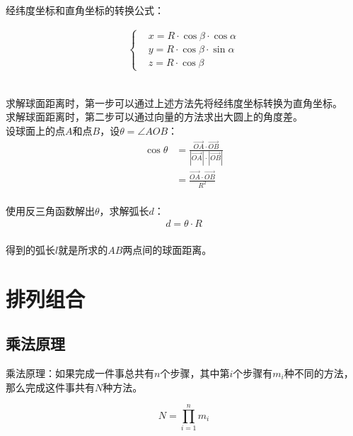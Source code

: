\documentclass[UTF8]{ctexart}
\begin{document}
    经纬度坐标和直角坐标的转换公式：\vspace{5pt}
    \begin{large}
        \begin{align*}
            \begin{cases}
                &x=R\cdot\cos{\beta}\cdot\cos{\alpha}\\[2mm]
                &y=R\cdot\cos{\beta}\cdot\sin{\alpha}\\[2mm]
                &z=R\cdot\cos{\beta}
            \end{cases}
        \end{align*}
    \end{large}\\
    求解球面距离时，第一步可以通过上述方法先将经纬度坐标转换为直角坐标。\\[3mm]
    求解球面距离时，第二步可以通过向量的方法求出大圆上的角度差。\\[5mm]
    设球面上的点$A$和点$B$，设$\theta=\angle AOB$：\vspace{3pt}
    \begin{align}
        \cos{\theta}
        &=\frac{\overrightarrow{OA}\cdot\overrightarrow{OB}}{|\overrightarrow{OA}|\cdot|\overrightarrow{OB}|}\\[4mm]
        &=\frac{\overrightarrow{OA}\cdot\overrightarrow{OB}}{R^2}
    \end{align}\\
    使用反三角函数解出$\theta$，求解弧长$d$：
    \begin{align}
        d=\theta\cdot R
    \end{align}\\
    得到的弧长$l$就是所求的$AB$两点间的球面距离。

\newpage

\section{排列组合}

\subsection{乘法原理}
    乘法原理：如果完成一件事总共有$n$个步骤，其中第$i$个步骤有$m_i$种不同的方法，那么完成这件事共有$N$种方法。
    \begin{large}
        \begin{equation*}
            N=\prod_{i=1}^{n}m_i
        \end{equation*}
    \end{large}
\end{document}
